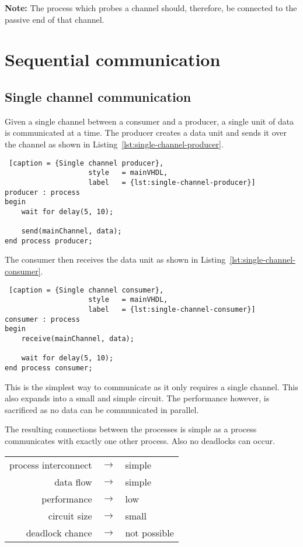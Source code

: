 \documentclass{report}
\begin{document}
\textbf{Note:} The process which probes a channel should, therefore, be
connected to the passive end of that channel.


\section{Sequential communication}

\subsection{Single channel communication}

Given a single channel between a consumer and a producer, a single unit of data
is communicated at a time. The producer creates a data unit and sends it over
the channel as shown in Listing~\ref{lst:single-channel-producer}.

\begin{lstlisting} [caption = {Single channel producer},
                    style   = mainVHDL,
                    label   = {lst:single-channel-producer}]
producer : process
begin
    wait for delay(5, 10);

    send(mainChannel, data);
end process producer;
\end{lstlisting}

The consumer then receives the data unit as shown in
Listing~\ref{lst:single-channel-consumer}.

\begin{lstlisting} [caption = {Single channel consumer},
                    style   = mainVHDL,
                    label   = {lst:single-channel-consumer}]
consumer : process
begin
    receive(mainChannel, data);

    wait for delay(5, 10);
end process consumer;

\end{lstlisting}

This is the simplest way to communicate as it only requires a single channel.
This also expands into a small and simple circuit. The performance however,
is sacrificed as no data can be communicated in parallel.

The resulting connections between the processes is simple as a process
communicates with exactly one other process. Also no deadlocks can occur.

\begin{table}[H]
    \centering
    \begin{tabular}{r c l}
        process interconnect & $\rightarrow$ & simple \\
        data flow            & $\rightarrow$ & simple \\
        performance          & $\rightarrow$ & low \\
        circuit size         & $\rightarrow$ & small \\
        deadlock chance      & $\rightarrow$ & not possible \\
    \end{tabular}
\end{table}
\end{document}
